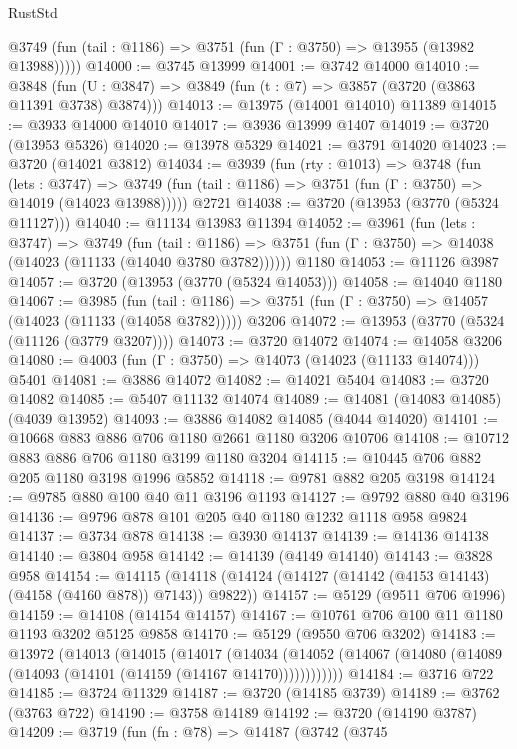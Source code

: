 \begin{lexlean}{RustStd}
\begin{coremodule}
      @3749 (fun (tail : @1186) => @3751 (fun (Γ : @3750) => @13955 (@13982 @13988)))))
@14000 := @3745 @13999
@14001 := @3742 @14000
@14010 := @3848
    (fun (U : @3847) => @3849 (fun (t : @7) => @3857 (@3720 (@3863 @11391 @3738) @3874)))
@14013 := @13975 (@14001 @14010) @11389
@14015 := @3933 @14000 @14010
@14017 := @3936 @13999 @1407
@14019 := @3720 (@13953 @5326)
@14020 := @13978 @5329
@14021 := @3791 @14020
@14023 := @3720 (@14021 @3812)
@14034 := @3939
    (fun (rty : @1013) =>
    @3748
      (fun (lets : @3747) =>
      @3749 (fun (tail : @1186) => @3751 (fun (Γ : @3750) => @14019 (@14023 @13988)))))
    @2721
@14038 := @3720 (@13953 (@3770 (@5324 @11127)))
@14040 := @11134 @13983 @11394
@14052 := @3961
    (fun (lets : @3747) =>
    @3749
      (fun (tail : @1186) =>
      @3751 (fun (Γ : @3750) => @14038 (@14023 (@11133 (@14040 @3780 @3782))))))
    @1180
@14053 := @11126 @3987
@14057 := @3720 (@13953 (@3770 (@5324 @14053)))
@14058 := @14040 @1180
@14067 := @3985
    (fun (tail : @1186) => @3751 (fun (Γ : @3750) => @14057 (@14023 (@11133 (@14058 @3782)))))
    @3206
@14072 := @13953 (@3770 (@5324 (@11126 (@3779 @3207))))
@14073 := @3720 @14072
@14074 := @14058 @3206
@14080 := @4003 (fun (Γ : @3750) => @14073 (@14023 (@11133 @14074))) @5401
@14081 := @3886 @14072
@14082 := @14021 @5404
@14083 := @3720 @14082
@14085 := @5407 @11132 @14074
@14089 := @14081 (@14083 @14085) (@4039 @13952)
@14093 := @3886 @14082 @14085 (@4044 @14020)
@14101 := @10668 @883 @886 @706 @1180 @2661 @1180 @3206 @10706
@14108 := @10712 @883 @886 @706 @1180 @3199 @1180 @3204
@14115 := @10445 @706 @882 @205 @1180 @3198 @1996 @5852
@14118 := @9781 @882 @205 @3198
@14124 := @9785 @880 @100 @40 @11 @3196 @1193
@14127 := @9792 @880 @40 @3196
@14136 := @9796 @878 @101 @205 @40 @1180 @1232 @1118 @958 @9824
@14137 := @3734 @878
@14138 := @3930 @14137
@14139 := @14136 @14138
@14140 := @3804 @958
@14142 := @14139 (@4149 @14140)
@14143 := @3828 @958
@14154 := @14115 (@14118 (@14124 (@14127 (@14142 (@4153 @14143) (@4158 (@4160 @878)) @7143)) @9822))
@14157 := @5129 (@9511 @706 @1996)
@14159 := @14108 (@14154 @14157)
@14167 := @10761 @706 @100 @11 @1180 @1193 @3202 @5125 @9858
@14170 := @5129 (@9550 @706 @3202)
@14183 := @13972
    (@14013
      (@14015
        (@14017
          (@14034 (@14052 (@14067 (@14080 (@14089 (@14093 (@14101 (@14159 (@14167 @14170))))))))))))
@14184 := @3716 @722
@14185 := @3724 @11329
@14187 := @3720 (@14185 @3739)
@14189 := @3762 (@3763 @722)
@14190 := @3758 @14189
@14192 := @3720 (@14190 @3787)
@14209 := @3719
    (fun (fn : @78) =>
    @14187
      (@3742
        (@3745

\end{coremodule}
\end{lexlean}
